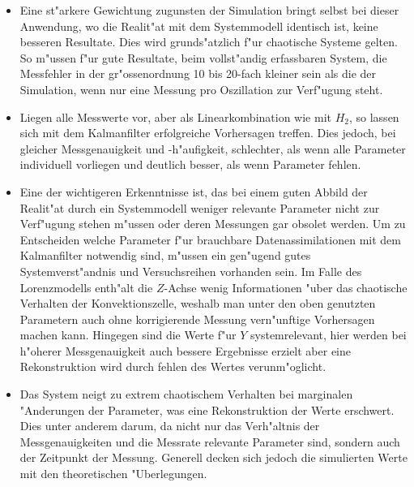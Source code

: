 \begin{refsection}
\begin{itemize}
\item
Eine st"arkere Gewichtung zugunsten der Simulation bringt selbst bei dieser Anwendung, wo die Realit"at mit dem Systemmodell identisch ist, keine besseren Resultate. Dies wird grunds"atzlich f"ur chaotische Systeme gelten. So m"ussen f"ur gute Resultate, beim vollst"andig erfassbaren System, die Messfehler in der gr"ossenordnung 10 bis 20-fach kleiner sein als die der Simulation, wenn nur eine Messung pro Oszillation zur Verf"ugung steht.

\item
Liegen alle Messwerte vor, aber als Linearkombination wie mit $H_{2}$, so lassen sich mit dem Kalmanfilter erfolgreiche Vorhersagen treffen. Dies jedoch, bei gleicher Messgenauigkeit und -h"aufigkeit, schlechter, als wenn alle Parameter individuell vorliegen und deutlich besser, als wenn Parameter fehlen.

\item
Eine der wichtigeren Erkenntnisse ist, das bei einem guten Abbild der Realit"at durch ein Systemmodell weniger relevante Parameter nicht zur Verf"ugung stehen m"ussen oder deren Messungen gar obsolet werden. Um zu Entscheiden welche Parameter f"ur brauchbare Datenassimilationen mit dem Kalmanfilter notwendig sind, m"ussen ein gen"ugend gutes Systemverst"andnis und Versuchsreihen vorhanden sein. Im Falle des Lorenzmodells enth"alt die $Z$-Achse wenig Informationen "uber das chaotische Verhalten der Konvektionszelle, weshalb man unter den oben genutzten Parametern auch ohne korrigierende Messung vern"unftige Vorhersagen machen kann. Hingegen sind die Werte f"ur $Y$ systemrelevant, hier werden bei h"oherer Messgenauigkeit auch bessere Ergebnisse erzielt aber eine Rekonstruktion wird durch fehlen des Wertes verunm"oglicht.

\item
Das System neigt zu extrem chaotischem Verhalten bei marginalen "Anderungen der Parameter, was eine Rekonstruktion der Werte erschwert. Dies unter anderem darum, da nicht nur das Verh"altnis der Messgenauigkeiten und die Messrate relevante Parameter sind, sondern auch der Zeitpunkt der Messung. Generell decken sich jedoch die simulierten Werte mit den theoretischen "Uberlegungen.

\end{itemize}

\printbibliography[heading=subbibliography]
\end{refsection}
